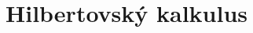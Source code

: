 \documentclass{beamer}
\begin{document}


    

    


\section{Hilbertovský kalkulus}
\end{document}
